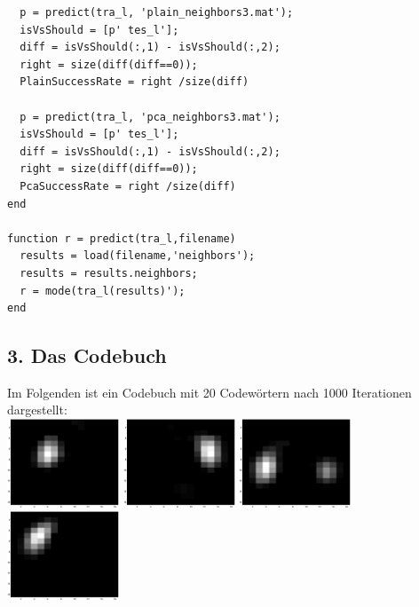 \documentclass{article}
\begin{document}
\begin{lstlisting}
  p = predict(tra_l, 'plain_neighbors3.mat');
  isVsShould = [p' tes_l'];
  diff = isVsShould(:,1) - isVsShould(:,2);
  right = size(diff(diff==0));
  PlainSuccessRate = right /size(diff)

  p = predict(tra_l, 'pca_neighbors3.mat');
  isVsShould = [p' tes_l'];
  diff = isVsShould(:,1) - isVsShould(:,2);
  right = size(diff(diff==0));
  PcaSuccessRate = right /size(diff)
end

function r = predict(tra_l,filename)
  results = load(filename,'neighbors');
  results = results.neighbors;
  r = mode(tra_l(results)');
end
\end{lstlisting}

\newpage
\subsection*{3. Das Codebuch}
Im Folgenden ist ein Codebuch mit 20 Codewörtern nach 1000 Iterationen
dargestellt:\\
\includegraphics[width=0.25\textwidth]{codebook1.eps}\hspace{0.03\textwidth}%
\includegraphics[width=0.25\textwidth]{codebook2.eps}\hspace{0.03\textwidth}%
\includegraphics[width=0.25\textwidth]{codebook3.eps}\hspace{0.03\textwidth}%
\includegraphics[width=0.25\textwidth]{codebook4.eps}\\[1em]
\end{document}
